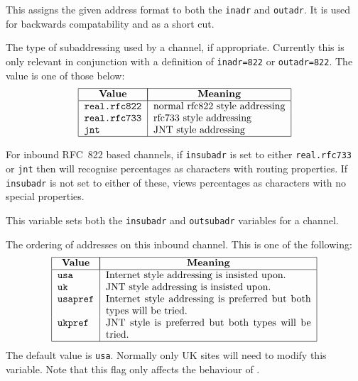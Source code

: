 \begin{describe}
\item[\verb+adr=type+:]
This assigns the given address format to both the \verb|inadr| and
\verb|outadr|. It is used for backwards compatability and as a short cut.


\item[\verb+insubadr=value+/\verb+outsubadr=value+:]
The type of subaddressing used by a channel, if appropriate.
Currently this is only relevant in conjunction with a definition of
\verb+inadr=822+ or \verb|outadr=822|. The value is one of those below:
\[\begin{tabular}{|l|l|}
\hline
	\multicolumn{1}{|c|}{\bf Value} &
		\multicolumn{1}{|c|}{\bf Meaning}\\
\hline
	\tt	real.rfc822&	normal rfc822 style addressing \\
	\tt	real.rfc733&	rfc733 style addressing \\
	\tt	jnt&		JNT style addressing \\
\hline
\end{tabular}\]

For inbound RFC~822 based channels, if \verb+insubadr+ is set to either
\verb+real.rfc733+ or \verb+jnt+ then  will recognise
percentages as characters with routing properties.
If \verb+insubadr+ is not set to either of these,  views
percentages as characters with no special properties.

\item[\verb+subadr=type+:] 
This variable sets both the \verb|insubadr| and \verb|outsubadr|
variables for a channel.

\item[\verb+adr-order=value+:]
The ordering of addresses on this
inbound channel. This is one of the following:
\[\begin{tabular}{|l|p{0.6\textwidth}|}
\hline
	\multicolumn{1}{|c|}{\bf Value} &
		\multicolumn{1}{|c|}{\bf Meaning}\\
\hline
	\tt usa&	Internet style addressing is insisted upon.\\
	\tt uk&		JNT style addressing is insisted upon.\\
	\tt usapref&	Internet style addressing is preferred but both
types will be tried.\\
	\tt ukpref&	JNT style is preferred but both types will be
tried. \\
\hline
\end{tabular}\]
The default value is \verb|usa|. Normally only UK sites will need to
modify this variable. Note that this flag only affects the behaviour
of .


\end{describe}
